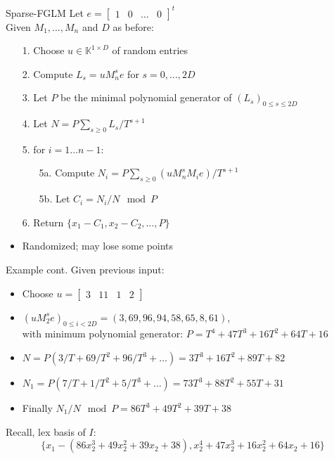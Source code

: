 \documentclass{beamer}
\begin{document}
\begin{frame}{Sparse-FGLM}
	Let $e = \begin{bmatrix}
	1 & 0 & \dots & 0
	\end{bmatrix}^t$\\
	Given $M_1,\dots,M_n$ and $D$ as before:
	\begin{itemize}
		\item[1.] Choose $u\in \mathbb{K}^{1\times D}$ of random entries
		\item[2.] Compute $L_s = u M_n^s e$ for $s= 0,\dots, 2D$
		\item[3.] Let $P$ be the
		minimal polynomial generator
		of $(L_s)_{0\le s \le 2D}$
		\item[4.] Let $N = P \sum_{s\ge 0} L_s / T^{s+1}$
		\item[5.] for $i = 1 \dots n-1$:
		\begin{itemize}
			\item[5a.] Compute $N_i = P \sum_{s\ge 0} (uM_n^s M_i e)/ T^{s+1}  $
			\item[5b.] Let $C_i = N_i / N \mod P$
		\end{itemize}
		\item[6.] Return $\{ x_1 - C_1, x_2-C_2,\dots, P  \}$
	\end{itemize}
	\begin{itemize}
		\item Randomized; may lose some points
	\end{itemize}
\end{frame}

\begin{frame}{Example cont.}
	Given previous input:
	\begin{itemize}
		\item Choose $u = \begin{bmatrix} 3 & 11 & 1 & 2 \end{bmatrix}$\\
		\item $(uM_2^s e)_ {0 \le i < 2D} = (3,69,96,94,58,65,8,61)$,\\
		with minimum polynomial generator: $P = T^4 + 47T^3 + 16T^2 + 64T + 16$\\
		\pause
		\item $N = P(3/T + 69/T^2 + 96/T^3 + \dots  ) =  3T^3+16T^2+ 89T+82 $\\
		\item $N_1 = P(7/T +1/T^2 + 5/T^3 + \dots) = 73T^3+ 88T^2+ 55T+31$\\
		\pause
		\item Finally $N_1/N \mod P = 86T^3 + 49T^2 + 39T + 38$
	\end{itemize}
	Recall, lex basis of $I$:
	$$ \{
	x_1 -(86x_2^3 + 49x_2^2 + 39x_2 + 38) ,x_2^4 + 47x_2^3 + 16x_2^2 + 64x_2 + 16\}$$
	
	
\end{frame}
\end{document}
